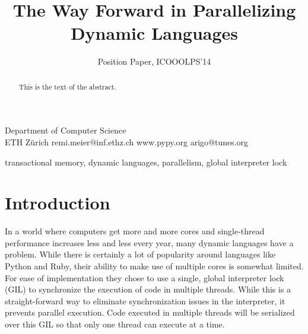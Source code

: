 \documentclass{sigplanconf}
\begin{document}
\setlength{\pdfpageheight}{\paperheight}
\setlength{\pdfpagewidth}{\paperwidth}






\title{The Way Forward in Parallelizing Dynamic Languages}
\subtitle{Position Paper, ICOOOLPS'14}

           {Department of Computer Science\\ ETH Zürich}
           {remi.meier@inf.ethz.ch}
           {www.pypy.org}
           {arigo@tunes.org}

\maketitle

\begin{abstract}
This is the text of the abstract.
\end{abstract}



\keywords
transactional memory, dynamic languages, parallelism, global interpreter lock

\section{Introduction}
In a world where computers get more and more cores and single-thread
performance increases less and less every year, many dynamic languages
have a problem. While there is certainly a lot of popularity around
languages like Python and Ruby, their ability to make use of multiple
cores is somewhat limited. For ease of implementation they chose to
use a single, global interpreter lock (GIL) to synchronize the
execution of code in multiple threads. While this is a
straight-forward way to eliminate synchronization issues in the
interpreter, it prevents parallel execution. Code executed in multiple
threads will be serialized over this GIL so that only one thread can
execute at a time.
\end{document}
